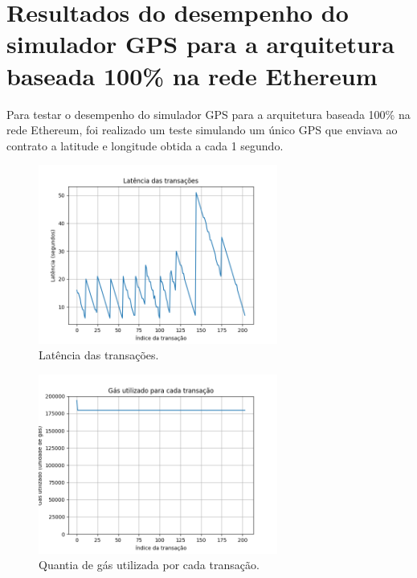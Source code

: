\section{Resultados do desempenho do simulador GPS para a arquitetura baseada 100\% na rede Ethereum}

Para testar o desempenho do simulador GPS para a arquitetura baseada 100\% na rede Ethereum, foi realizado um teste simulando um único GPS que enviava ao contrato a latitude e longitude obtida a cada 1 segundo.

\begin{figure}[h!]
\centering
\includegraphics[width=0.7\textwidth]{Cap3/scife_gps_sim_latency.png}
\caption{Latência das transações.}
\label{scife_gps_sim_latency}
\end{figure}

\begin{figure}[h!]
\centering
\includegraphics[width=0.7\textwidth]{Cap3/scife_gps_sim_gas_used.png}
\caption{Quantia de gás utilizada por cada transação.}
\label{scife_gps_sim_gas_used}
\end{figure}

